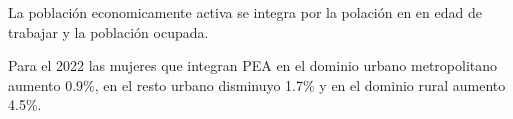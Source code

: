 La población economicamente activa se integra por la polación en en edad de trabajar y la población ocupada. 

Para el 2022 las mujeres que integran PEA en el dominio urbano metropolitano aumento 0.9\%, en el resto urbano disminuyo 1.7\% y en el dominio rural aumento 4.5\%.

